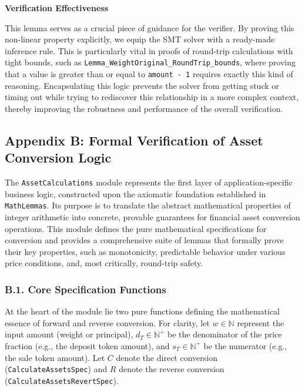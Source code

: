 \documentclass[
  english,
  onecolumn]{article}
\begin{document}
\textbf{Verification Effectiveness}

This lemma serves as a crucial piece of guidance for the verifier. By
proving this non-linear property explicitly, we equip the SMT solver
with a ready-made inference rule. This is particularly vital in proofs
of round-trip calculations with tight bounds, such as
\texttt{Lemma\_WeightOriginal\_RoundTrip\_bounds}, where proving that a
value is greater than or equal to \texttt{amount\ -\ 1} requires exactly
this kind of reasoning. Encapsulating this logic prevents the solver
from getting stuck or timing out while trying to rediscover this
relationship in a more complex context, thereby improving the robustness
and performance of the overall verification.

\subsection{Appendix B: Formal Verification of Asset Conversion
Logic}\label{appendix-b-formal-verification-of-asset-conversion-logic}

The \texttt{AssetCalculations} module represents the first layer of
application-specific business logic, constructed upon the axiomatic
foundation established in \texttt{MathLemmas}. Its purpose is to
translate the abstract mathematical properties of integer arithmetic
into concrete, provable guarantees for financial asset conversion
operations. This module defines the pure mathematical specifications for
conversion and provides a comprehensive suite of lemmas that formally
prove their key properties, such as monotonicity, predictable behavior
under various price conditions, and, most critically, round-trip safety.

\subsubsection{B.1. Core Specification
Functions}\label{b.1.-core-specification-functions}

At the heart of the module lie two pure functions defining the
mathematical essence of forward and reverse conversion. For clarity, let
\(w \in \mathbb{N}\) represent the input amount (weight or principal),
\(d_T \in \mathbb{N}^+\) be the denominator of the price fraction (e.g.,
the deposit token amount), and \(s_T \in \mathbb{N}^+\) be the numerator
(e.g., the sale token amount). Let \(C\) denote the direct conversion
(\texttt{CalculateAssetsSpec}) and \(R\) denote the reverse conversion
(\texttt{CalculateAssetsRevertSpec}).
\end{document}
